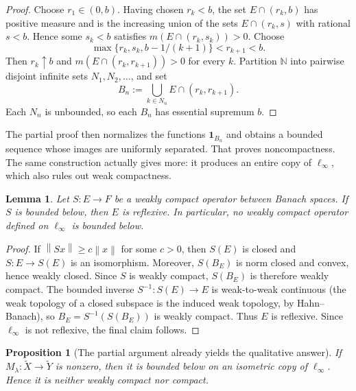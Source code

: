 \documentclass[11pt]{article}
\newtheorem{proposition}[theorem]{Proposition}
\newtheorem{lemma}[theorem]{Lemma}
\theoremstyle{remark}
\newcommand{\tX}{\widetilde X}
\newcommand{\tY}{\widetilde Y}
\newcommand{\norm}[1]{\left\lVert #1\right\rVert}
\newcommand{\one}{\mathbf 1}
\begin{document}
\begin{proof}
Choose $r_1\in(0,b)$.  Having chosen $r_k<b$, the set
$E\cap(r_k,b)$ has positive measure and is the increasing union of the sets
$E\cap(r_k,s)$ with rational $s<b$.  Hence some $s_k<b$ satisfies
$m(E\cap(r_k,s_k))>0$.  Choose
\[
 \max\{r_k,s_k,b-1/(k+1)\}<r_{k+1}<b.
\]
Then $r_k\uparrow b$ and
$m(E\cap(r_k,r_{k+1}))>0$ for every $k$.  Partition
$\mathbb N$ into pairwise disjoint infinite sets $N_1,N_2,\ldots$, and set
\[
 B_n:=\bigcup_{k\in N_n} E\cap(r_k,r_{k+1}).
\]
Each $N_n$ is unbounded, so each $B_n$ has essential supremum $b$.
\end{proof}

The partial proof then normalizes the functions $\one_{B_n}$ and obtains a
bounded sequence whose images are uniformly separated.  That proves
noncompactness.  The same construction actually gives more: it produces an
entire copy of $\ell_\infty$, which also rules out weak compactness.

\begin{lemma}\label{lem:weak-below}
Let $S:E\to F$ be a weakly compact operator between Banach spaces.  If $S$ is
bounded below, then $E$ is reflexive.  In particular, no weakly compact
operator defined on $\ell_\infty$ is bounded below.
\end{lemma}

\begin{proof}
If $\norm{Sx}\geq c\norm{x}$ for some $c>0$, then $S(E)$ is closed and
$S:E\to S(E)$ is an isomorphism.  Moreover, $S(B_E)$ is norm closed and
convex, hence weakly closed.  Since $S$ is weakly compact, $S(B_E)$ is
therefore weakly compact.  The bounded inverse $S^{-1}:S(E)\to E$ is
weak-to-weak continuous (the weak topology of a closed subspace is the
induced weak topology, by Hahn--Banach), so $B_E=S^{-1}(S(B_E))$ is weakly
compact.  Thus $E$ is reflexive.  Since $\ell_\infty$ is not reflexive, the
final claim follows.
\end{proof}

\begin{proposition}[The partial argument already yields the qualitative
answer]\label{prop:qualitative}
If $M_\lambda:\tX\to\tY$ is nonzero, then it is bounded below on an isometric
copy of $\ell_\infty$.  Hence it is neither weakly compact nor compact.
\end{proposition}
\end{document}
